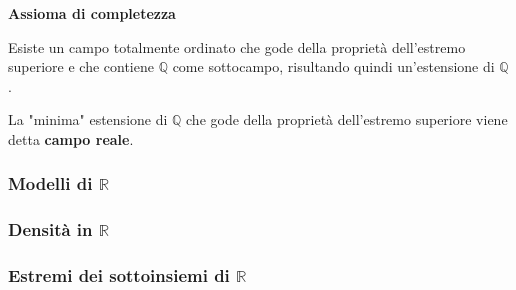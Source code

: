\begin{axiom}
    \textbf{Assioma di completezza}

    Esiste un campo totalmente ordinato che gode della proprietà dell'estremo
    superiore e che contiene $\mathbb{Q}$ come sottocampo, risultando quindi un'estensione di $\mathbb{Q}$.
\end{axiom}

La "minima" estensione di $\mathbb{Q}$ che gode della proprietà dell'estremo superiore viene detta
\textbf{campo reale}.

\subsubsection{Modelli di $\mathbb{R}$}



\subsubsection{Densità in $\mathbb{R}$}



\subsubsection{Estremi dei sottoinsiemi di $\mathbb{R}$}

